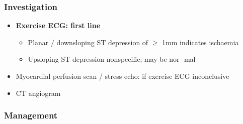\documentclass[
  12pt,
]{memoir}
\providecommand{\tightlist}{%
  \setlength{\itemsep}{0pt}\setlength{\parskip}{0pt}}
\begin{document}
\hypertarget{investigation-1}{%
\subsubsection{Investigation}\label{investigation-1}}

\begin{itemize}
\tightlist
\item
  \textbf{Exercise ECG: first line}

  \begin{itemize}
  \tightlist
  \item
    Planar / downsloping ST depression of \(\ge\) 1mm indicates
    ischaemia
  \item
    Upsloping ST depression nonspecific; may be nor -mal
  \end{itemize}
\item
  Myocardial perfusion scan / stress echo: if exercise ECG inconclusive
\item
  CT angiogram
\end{itemize}

\hypertarget{management-3}{%
\subsubsection{Management}\label{management-3}}
\end{document}
